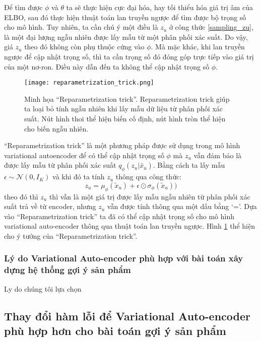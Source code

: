     Để tìm được $\phi$ và $\theta$ ta sẽ thực hiện cực đại hóa, hay tối thiểu hóa giá trị âm của ELBO, sau đó thực hiện thuật toán lan truyền ngược để tìm được bộ trọng số cho mô hình. 
    Tuy nhiên, ta cần chú ý một điều là $z_u$ ở công thức \ref{sampling_zu}, là một đại lượng ngẫu nhiên được lấy mẫu từ một phân phối xác suất.
    Do vậy, giá $z_u$ theo đó không còn phụ thuộc cứng vào $\phi$.
    Mà mặc khác, khi lan truyền ngược để cập nhật trọng số, thì ta cần trọng số đó đóng góp trực tiếp vào giá trị của một nơ-ron.
    Điều này dẫn đến ta không thể cập nhật trọng số $\phi$. 
    \begin{figure}
        \centering
        \texttt{[image: reparametrization\_trick.png]}
        \caption{Minh họa ``Reparametrization trick''. Reparametrization trick giúp ta loại bỏ tính ngẫu nhiên khi lấy mẫu dữ liệu từ phân phối xác suất. Nút hình thoi thể hiện biến cố định, nút hình tròn thể hiện cho biến ngẫu nhiên.}
        \label{fig_repatrick}
    \end{figure}
    ``Reparametrization trick'' là một phương pháp được sử dụng trong mô hình variational autoencoder để có thể cập nhật trọng số $\phi$ mà $z_u$ vẫn đảm bảo là được lấy mẫu từ phân phối xác suất $q_\phi(z_u|\tilde{x_u})$. 
    Bằng cách ta lấy mẫu $\epsilon \sim \mathcal{N}(0,I_K)$ và khi đó ta tính $z_u$ thông qua công thức:
    \begin{equation}
        z_u = \mu_\phi(\tilde{x}_u) + \epsilon \odot \sigma_\phi(\tilde{x}_u))
    \end{equation}
    theo đó thì $z_u$ thì vẫn là một giá trị được lấy mẫu ngẫu nhiên từ phân phối xác suất trả về từ encoder, nhưng $z_u$ vẫn được tính thông qua một dấu bằng `='.
    Dựa vào ``Reparametrization trick'' ta đã có thể cập nhật trọng số cho mô hình variational auto-encoder thông qua thuật toán lan truyền ngược. 
    Hình \ref{fig_repatrick} thể hiện cho ý tưởng của ``Reparametrization trick''.
    \subsubsection{Lý do Variational Auto-encoder phù hợp với bài toán xây dựng hệ thống gợi ý sản phẩm}
    Ly do chúng tôi lựa chọn

    \label{why_vae}
    \subsection{Thay đổi hàm lỗi để Variational Auto-encoder phù hợp hơn cho bài toán gợi ý sản phẩm}


